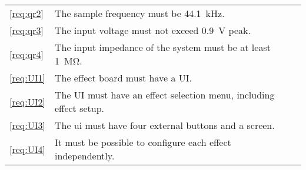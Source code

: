 \begin{table}[h]
\begin{tabularx}{\textwidth}{lXc}
		\autoref{req:qr2}           & The sample frequency must be \SI{44.1}{\kilo\hertz}.                                                                                              & \cmark    \\ \rowcolor{lightGrey}
		\autoref{req:qr3}           & The input voltage must not exceed \SI{0.9}{\volt} peak.                                                                                      & \cmark    \\
		\autoref{req:qr4}           & The input impedance of the system must be at least \SI{1}{\mega\ohm}.                                                                             & \cmark    \\ \rowcolor{lightGrey}
		\autoref{req:UI1}           & The effect board must have a UI.                                                                                                                      & \xmark    \\
		\autoref{req:UI2}           & The UI must have an effect selection menu, including effect setup.                                                                                  & \xmark    \\ \rowcolor{lightGrey}
		\autoref{req:UI3}           & The \gls{ui} must have four external buttons and a screen.                                                                                          & \xmark    \\
		\autoref{req:UI4}           & It must be possible to configure each effect independently.                                                                                           & \xmark
	\end{tabularx}
\end{table}